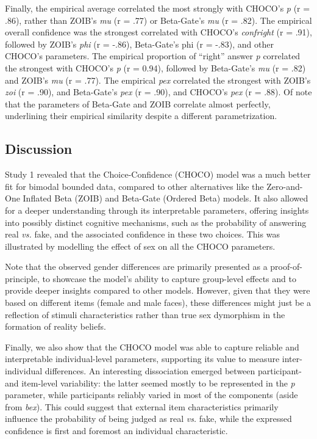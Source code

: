 \documentclass[
  jou,
  floatsintext,
  longtable,
  nolmodern,
  notxfonts,
  notimes,
  colorlinks=true,linkcolor=blue,citecolor=blue,urlcolor=blue]{apa7}
\begin{document}
Finally, the empirical average correlated the most strongly with CHOCO's
\emph{p} (r = .86), rather than ZOIB's \emph{mu} (r = .77) or
Beta-Gate's \emph{mu} (r = .82). The empirical overall confidence was
the strongest correlated with CHOCO's \emph{confright} (r = .91),
followed by ZOIB's \emph{phi} (r = -.86), Beta-Gate's phi (r = -.83),
and other CHOCO's parameters. The empirical proportion of ``right''
answer \emph{p} correlated the strongest with CHOCO's \emph{p} (r =
0.94), followed by Beta-Gate's \emph{mu} (r = .82) and ZOIB's \emph{mu}
(r = .77). The empirical \emph{pex} correlated the strongest with ZOIB's
\emph{zoi} (r = .90), and Beta-Gate's \emph{pex} (r = .90), and CHOCO's
\emph{pex} (r = .88). Of note that the parameters of Beta-Gate and ZOIB
correlate almost perfectly, underlining their empirical similarity
despite a different parametrization.

\subsection{Discussion}\label{discussion}

Study 1 revealed that the Choice-Confidence (CHOCO) model was a much
better fit for bimodal bounded data, compared to other alternatives like
the Zero-and-One Inflated Beta (ZOIB) and Beta-Gate (Ordered Beta)
models. It also allowed for a deeper understanding through its
interpretable parameters, offering insights into possibly distinct
cognitive mechanisms, such as the probability of answering real
\emph{vs.} fake, and the associated confidence in these two choices.
This was illustrated by modelling the effect of sex on all the CHOCO
parameters.

Note that the observed gender differences are primarily presented as a
proof-of-principle, to showcase the model's ability to capture
group-level effects and to provide deeper insights compared to other
models. However, given that they were based on different items (female
and male faces), these differences might just be a reflection of stimuli
characteristics rather than true sex dymorphism in the formation of
reality beliefs.

Finally, we also show that the CHOCO model was able to capture reliable
and interpretable individual-level parameters, supporting its value to
measure inter-individual differences. An interesting dissociation
emerged between participant- and item-level variability: the latter
seemed mostly to be represented in the \emph{p} parameter, while
participants reliably varied in most of the components (aside from
\emph{bex}). This could suggest that external item characteristics
primarily influence the probability of being judged as real \emph{vs.}
fake, while the expressed confidence is first and foremost an individual
characteristic.
\end{document}
